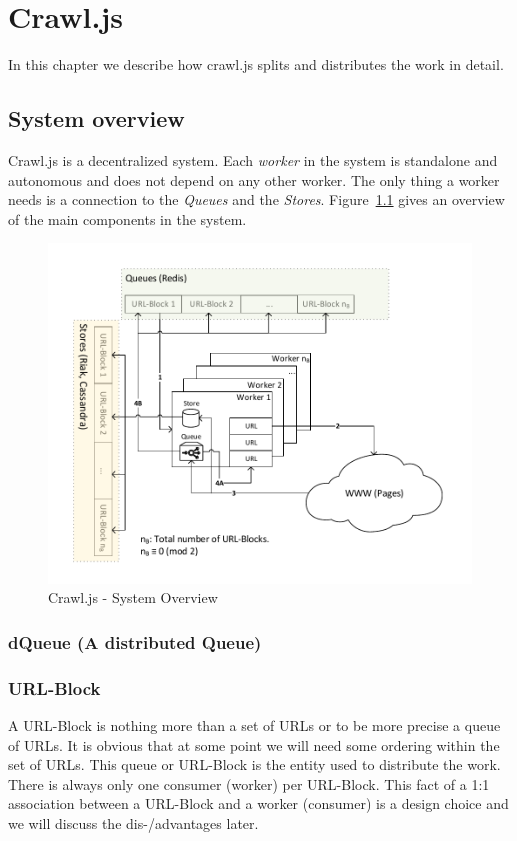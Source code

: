 
\chapter{Crawl.js} %
In this chapter we describe how crawl.js splits and distributes the work in detail.
\label{Chapter4} 

\section{System overview}
Crawl.js is a decentralized system. Each \emph{worker} in the system is standalone and autonomous and does not depend on any other worker. The only thing a worker needs is a connection to the \emph{Queues} and the \emph{Stores}. Figure~\ref{system_overview} gives an overview of the main components in the system.

\begin{figure}[h]
\centering
  \includegraphics[width=1\textwidth]{Figures/system_overview.pdf}
\caption{Crawl.js - System Overview}
\label{system_overview}
\end{figure}

\subsection{dQueue (A distributed Queue)}
\subsection{URL-Block}
A URL-Block is nothing more than a set of URLs or to be more precise a queue of URLs. It is obvious that at some point we will need some ordering within the set of URLs.
This queue or URL-Block is the entity used to distribute the work. There is always only one consumer (worker) per URL-Block.
This fact of a 1:1 association between a URL-Block and a worker (consumer) is a design choice and we will discuss the dis-/advantages later.

